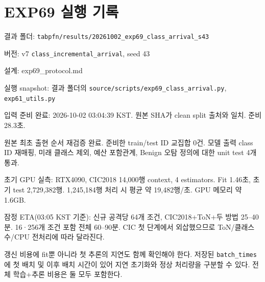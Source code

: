 \section{EXP69 실행 기록}
\par\noindent \textbullet\enspace 결과 폴더: \texttt{tabpfn/\allowbreak{}\allowbreak{}r\allowbreak{}esults/\allowbreak{}\allowbreak{}2\allowbreak{}0261002\_\allowbreak{}\allowbreak{}exp69\_\allowbreak{}\allowbreak{}cl\allowbreak{}ass\_\allowbreak{}\allowbreak{}arri\allowbreak{}val\_\allowbreak{}\allowbreak{}s43}


\par\noindent \textbullet\enspace 버전: v7 \texttt{class\_\allowbreak{}\allowbreak{}in\allowbreak{}crementa\allowbreak{}l\_\allowbreak{}\allowbreak{}arriva\allowbreak{}l}, seed 43


\par\noindent \textbullet\enspace 설계: exp69\_\allowbreak{}protocol.md


\par\noindent \textbullet\enspace 실행 snapshot: 결과 폴더의 \texttt{source/\allowbreak{}\allowbreak{}s\allowbreak{}cripts/\allowbreak{}\allowbreak{}e\allowbreak{}xp69\_\allowbreak{}\allowbreak{}cla\allowbreak{}ss\_\allowbreak{}\allowbreak{}arriv\allowbreak{}al.\allowbreak{}py}, \texttt{exp61\_\allowbreak{}\allowbreak{}ut\allowbreak{}ils.\allowbreak{}py}


\par\noindent \textbullet\enspace 입력 준비 완료: 2026-10-02 03:04:39 KST. 원본 SHA가 clean split 출처와 일치. 준비 28.3초.


\par\noindent \textbullet\enspace 원본 최초 출현 순서 재검증 완료. 준비한 train/\allowbreak{}test ID 교집합 0건. 모델 출력 class ID 재매핑, 미래 클래스 제외, 예산 포함관계, Benign 오탐 정의에 대한 unit test 4개 통과.


\par\noindent \textbullet\enspace 초기 GPU 실측: RTX4090, CIC2018 14,000행 context, 4 estimators. Fit 1.46초, 초기 test 2,729,382행. 1,245,184행 처리 시 평균 약 19,482행/\allowbreak{}초. GPU 메모리 약 1.6GB.


\par\noindent \textbullet\enspace 잠정 ETA(03:05 KST 기준): 신규 공격당 64개 조건, CIC2018+\allowbreak{}ToN+\allowbreak{}두 방법 25–40분. 16·256개 조건 포함 전체 60–90분. CIC 첫 단계에서 외삽했으므로 ToN/\allowbreak{}클래스 수/\allowbreak{}CPU 전처리에 따라 달라진다.


\par\noindent \textbullet\enspace 갱신 비용에 fit뿐 아니라 첫 추론의 지연도 함께 확인해야 한다. 저장된 \texttt{batch\_\allowbreak{}\allowbreak{}ti\allowbreak{}mes}에 첫 배치 및 이후 배치 시간이 있어 지연 초기화와 정상 처리량을 구분할 수 있다. 전체 학습+\allowbreak{}추론 비용은 둘 모두 포함한다.



